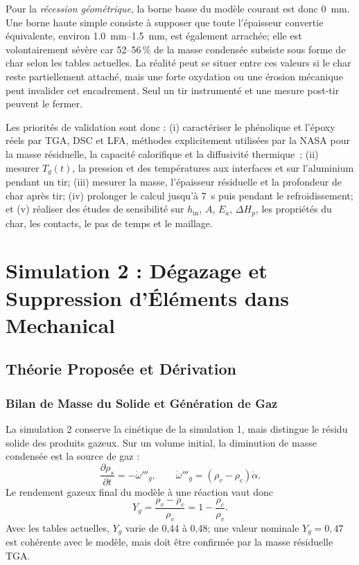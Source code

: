 \documentclass[oneside,openany]{amsdtx}
\newcommand{\pd}{\partial}
\begin{document}
Pour la \emph{récession géométrique}, la borne basse du modèle courant est donc
\SI{0}{mm}. Une borne haute simple consiste à supposer que toute l'épaisseur
convertie équivalente, environ \SIrange{1.0}{1.5}{mm}, est également arrachée;
elle est volontairement sévère car 52--56\,\% de la masse condensée subsiste
sous forme de char selon les tables actuelles. La réalité peut se situer entre
ces valeurs si le char reste partiellement attaché, mais une forte oxydation ou
une érosion mécanique peut invalider cet encadrement. Seul un tir instrumenté
et une mesure post-tir peuvent le fermer.

Les priorités de validation sont donc : (i) caractériser le phénolique et
l'époxy réels par TGA, DSC et LFA, méthodes explicitement utilisées par la NASA
pour la masse résiduelle, la capacité calorifique et la diffusivité
thermique~\cite{nasa-testing}; (ii) mesurer \(T_g(t)\), la pression et des
températures aux interfaces et sur l'aluminium pendant un tir; (iii) mesurer la
masse, l'épaisseur résiduelle et la profondeur de char après tir; (iv) prolonger
le calcul jusqu'à \SI{7}{s} puis pendant le refroidissement; et (v) réaliser des
études de sensibilité sur \(h_\mathrm{in}\), \(A\), \(E_a\), \(\Delta H_p\),
les propriétés du char, les contacts, le pas de temps et le maillage.

\clearpage
\section{Simulation 2 : Dégazage et Suppression d'Éléments dans Mechanical}

\subsection{Théorie Proposée et Dérivation}

\subsubsection{Bilan de Masse du Solide et Génération de Gaz}

La simulation 2 conserve la cinétique de la simulation 1, mais distingue le
résidu solide des produits gazeux. Sur un volume initial, la diminution de masse
condensée est la source de gaz :
\begin{equation}
  \frac{\pd\rho_s}{\pd t}=-\dot\omega'''_g,
  \qquad
  \dot\omega'''_g=(\rho_v-\rho_c)\dot\alpha.
  \label{eq:solid-mass-sim2}
\end{equation}
Le rendement gazeux final du modèle à une réaction vaut donc
\begin{equation}
  Y_g=\frac{\rho_v-\rho_c}{\rho_v}=1-\frac{\rho_c}{\rho_v}.
  \label{eq:gas-yield}
\end{equation}
Avec les tables actuelles, \(Y_g\) varie de 0,44 à 0,48; une valeur nominale
\(Y_g=0{,}47\) est cohérente avec le modèle, mais doit être confirmée par la
masse résiduelle TGA.
\end{document}
